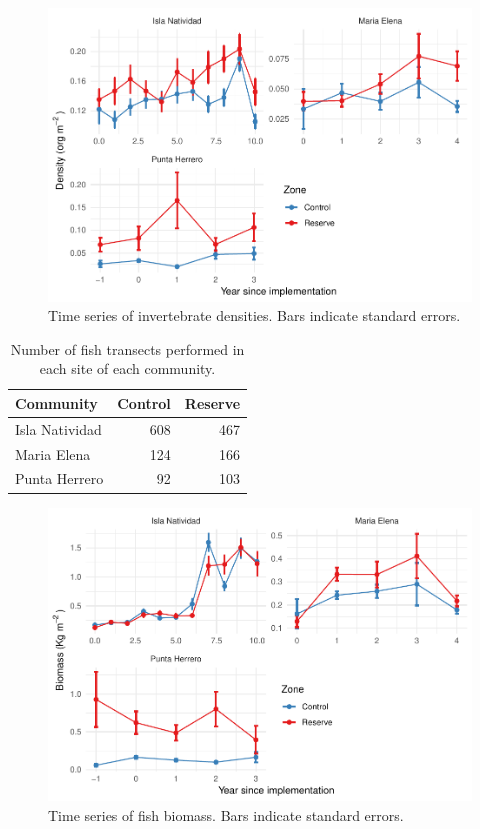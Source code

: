 \documentclass[utf8]{frontiers_suppmat} %
\begin{document}
\begin{figure}
\centering
\includegraphics{SupplementaryMaterial_files/figure-latex/unnamed-chunk-4-1.pdf}
\caption{\label{fig:unnamed-chunk-4}Time series of invertebrate densities. Bars indicate standard errors.}
\end{figure}

\clearpage

\begin{table}[t]

\caption{\label{tab:unnamed-chunk-5}Number of fish transects performed in each site of each community.}
\centering
\begin{tabular}{lrr}
\toprule
Community & Control & Reserve\\
\midrule
Isla Natividad & 608 & 467\\
Maria Elena & 124 & 166\\
Punta Herrero & 92 & 103\\
\bottomrule
\end{tabular}
\end{table}

\begin{figure}
\centering
\includegraphics{SupplementaryMaterial_files/figure-latex/unnamed-chunk-6-1.pdf}
\caption{\label{fig:unnamed-chunk-6}Time series of fish biomass. Bars indicate standard errors.}
\end{figure}
\end{document}
